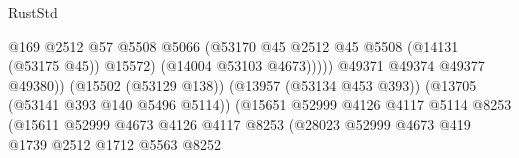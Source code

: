 \begin{lexlean}{RustStd}
\begin{coremodule}
                                                            @169
                                                            @2512
                                                            @57
                                                            @5508
                                                            @5066
                                                            (@53170
                                                              @45
                                                              @2512
                                                              @45
                                                              @5508
                                                              (@14131 (@53175 @45))
                                                              @15572)
                                                            (@14004 @53103 @4673)))))
                                                    @49371
                                                    @49374
                                                    @49377
                                                    @49380))
                                                (@15502 (@53129 @138))
                                                (@13957 (@53134 @453 @393))
                                                (@13705 (@53141 @393 @140 @5496 @5114))
                                                (@15651
                                                  @52999
                                                  @4126
                                                  @4117
                                                  @5114
                                                  @8253
                                                  (@15611
                                                    @52999
                                                    @4673
                                                    @4126
                                                    @4117
                                                    @8253
                                                    (@28023
                                                      @52999
                                                      @4673
                                                      @419
                                                      @1739
                                                      @2512
                                                      @1712
                                                      @5563
                                                      @8252

\end{coremodule}
\end{lexlean}
